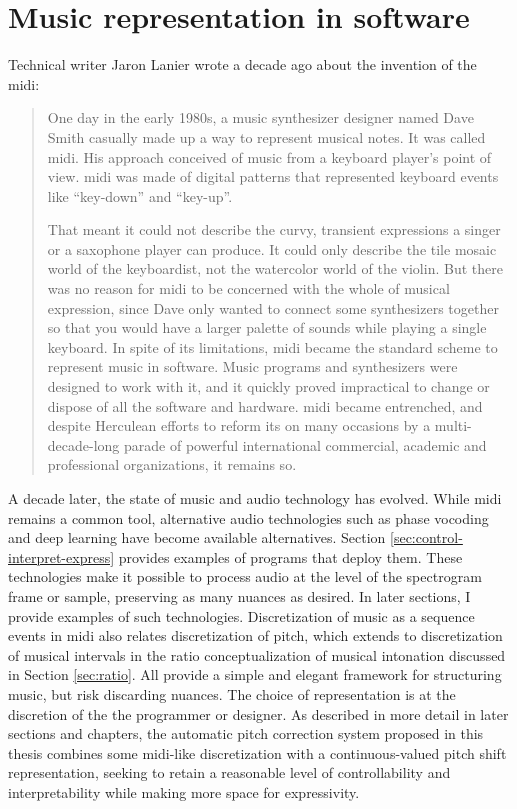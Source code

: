 \section{Music representation in software}
Technical writer Jaron Lanier wrote a decade ago about the invention of the \gls{midi}: \begin{quote}One day in the early 1980s, a music synthesizer designer named Dave Smith casually made up a way to represent musical notes. It was called \gls{midi}. His approach conceived of music from a keyboard player's point of view. \gls{midi} was made of digital patterns that represented keyboard events like ``key-down'' and ``key-up''. 

That meant it could not describe the curvy, transient expressions a singer or a saxophone player can produce. It could only describe the tile mosaic world of the keyboardist, not the watercolor world of the violin. But there was no reason for \gls{midi} to be concerned with the whole of musical expression, since Dave only wanted to connect some synthesizers together so that you would have a larger palette of sounds while playing a single keyboard. In spite of its limitations, \gls{midi} became the standard scheme to represent music in software. Music programs and synthesizers were designed to work with it, and it quickly proved impractical to change or dispose of all the software and hardware. \gls{midi} became entrenched, and despite Herculean efforts to reform its on many occasions by a multi-decade-long parade of powerful international commercial, academic and professional organizations, it remains so. \cite[p.~7]{lanier2010you}\end{quote}

A decade later, the state of music and audio technology has evolved. While \gls{midi} remains a common tool, alternative audio technologies such as phase vocoding and deep learning have become available alternatives. Section \ref{sec:control-interpret-express} provides examples of programs that deploy them. These technologies make it possible to process audio at the level of the spectrogram frame or sample, preserving as many nuances as desired. In later sections, I provide examples of such technologies. Discretization of music as a sequence events in \gls{midi} also relates discretization of pitch, which extends to discretization of musical intervals in the ratio conceptualization of musical intonation discussed in Section \ref{sec:ratio}. All provide a simple and elegant framework for structuring music, but risk discarding nuances. The choice of representation is at the discretion of the the programmer or designer. As described in more detail in later sections and chapters, the automatic pitch correction system proposed in this thesis combines some \gls{midi}-like discretization with a continuous-valued pitch shift representation, seeking to retain a reasonable level of controllability and interpretability while making more space for expressivity.

